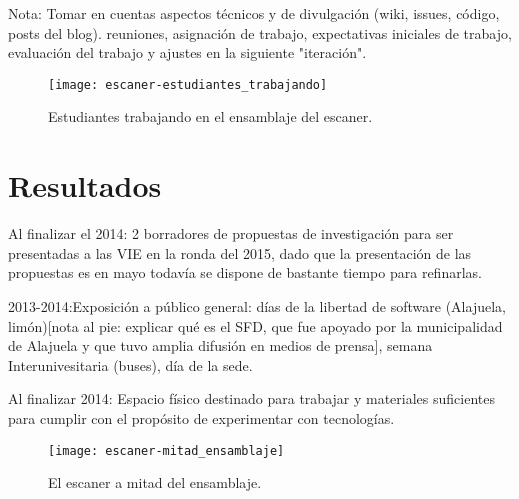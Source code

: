 \documentclass[conference]{IEEEtran}
\begin{document}
Nota: Tomar en cuentas aspectos técnicos y de divulgación (wiki, issues, código, posts del blog).  reuniones, asignación de trabajo, expectativas iniciales de trabajo, evaluación del trabajo y ajustes en la siguiente "iteración". 


\begin{figure}[!t]
\centering
\texttt{[image: escaner-estudiantes\_trabajando]}
\caption{Estudiantes trabajando en el ensamblaje del escaner.}
\label{escaner}
\end{figure}




\section{Resultados}


Al finalizar el 2014: 2 borradores de propuestas de investigación para ser presentadas a las VIE en la ronda del 2015, dado que la presentación de las propuestas es en mayo todavía se dispone de bastante tiempo para refinarlas. 

2013-2014:Exposición a público general: días de la libertad de software (Alajuela, limón)[nota al pie: explicar qué es el SFD, que fue apoyado por la municipalidad de Alajuela y que tuvo amplia difusión en medios de prensa], semana Interunivesitaria (buses), día de la sede. 

Al finalizar 2014: Espacio físico destinado para trabajar y materiales suficientes para cumplir con el propósito de experimentar con tecnologías.  



\begin{figure}[!t]
\centering
\texttt{[image: escaner-mitad\_ensamblaje]}
\caption{El escaner a mitad del ensamblaje.}
\label{escaner}
\end{figure}
\end{document}
